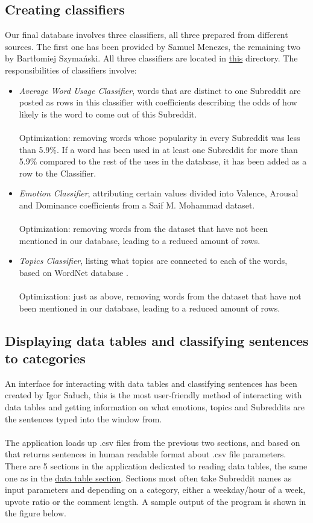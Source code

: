 \documentclass[openany]{article}
\begin{document}
\subsection{Creating classifiers}
Our final database involves three classifiers, all three prepared from different sources. The first one has been provided by Samuel Menezes, the remaining two by Bartłomiej Szymański. All three classifiers are located in  \href{https://drive.google.com/drive/folders/1lTxPU9afFa5V2qXWcALFKBRBgVuEu87F}{this} directory.
The responsibilities of classifiers involve:
\begin{itemize}
    \item \textit{Average Word Usage Classifier}, words that are distinct to one Subreddit are posted as rows in this classifier with coefficients describing the odds of how likely is the word to come out of this Subreddit. \\ \\
    Optimization: removing words whose popularity in every Subreddit was less than 5.9\%. If a word has been used in at least one Subreddit for more than 5.9\% compared to the rest of the uses in the database, it has been added as a row to the Classifier.
    \item \textit{Emotion Classifier}, attributing certain values divided into Valence, Arousal and Dominance coefficients from a Saif M. Mohammad dataset\cite{emotions}. \\ \\
    Optimization: removing words from the dataset that have not been mentioned in our database, leading to a reduced amount of rows.
    \item \textit{Topics Classifier}, listing what topics are connected to each of the words, based on WordNet database \cite{wordnet}. \\ \\
    Optimization: just as above, removing words from the dataset that have not been mentioned in our database, leading to a reduced amount of rows.
\end{itemize}
\subsection{Displaying data tables and classifying sentences to categories}
An interface for interacting with data tables and classifying sentences has been created by Igor Sałuch, this is the most user-friendly method of interacting with data tables and getting information on what emotions, topics and Subreddits are the sentences typed into the window from.\\ \\
The application loads up .csv files from the previous two sections, and based on that returns sentences in human readable format about .csv file parameters.
There are 5 sections in the application dedicated to reading data tables, the same one as in the  \hyperref[sec:datatables]{data table section}. Sections most often take Subreddit names as input parameters and depending on a category, either a weekday/hour of a week, upvote ratio or the comment length. A sample output of the program is shown in the figure below. 
\end{document}
